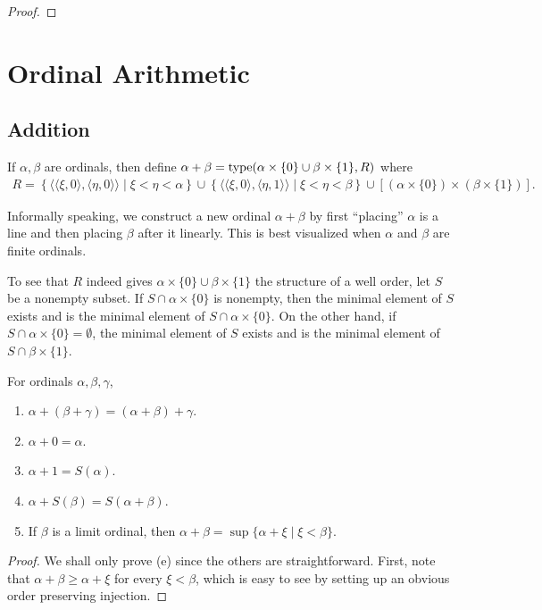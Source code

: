 \begin{proof}
    
\end{proof}

\section{Ordinal Arithmetic}
\subsection*{Addition}

\begin{definition}
    If $\alpha,\beta$ are ordinals, then define $\alpha + \beta = \operatorname{type}(\alpha\times\{0\}\cup\beta\times\{1\},R)$ where 
    \begin{align*}
        R = \left\{\langle\langle\xi,0\rangle,\langle\eta,0\rangle\rangle\mid \xi < \eta < \alpha\right\}\cup\left\{\langle\langle\xi,0\rangle,\langle\eta,1\rangle\rangle\mid\xi < \eta < \beta\right\}\cup\left[(\alpha\times\{0\})\times(\beta\times\{1\})\right].
    \end{align*}
\end{definition}

Informally speaking, we construct a new ordinal $\alpha + \beta$ by first ``placing'' $\alpha$ is a line and then placing $\beta$ after it linearly. This is best visualized when $\alpha$ and $\beta$ are finite ordinals.

To see that $R$ indeed gives $\alpha\times\{0\}\cup\beta\times\{1\}$ the structure of a well order, let $S$ be a nonempty subset. If $S\cap\alpha\times\{0\}$ is nonempty, then the minimal element of $S$ exists and is the minimal element of $S\cap\alpha\times\{0\}$. On the other hand, if $S\cap\alpha\times\{0\} = \emptyset$, the minimal element of $S$ exists and is the minimal element of $S\cap\beta\times\{1\}$. 

\begin{lemma}
    For ordinals $\alpha,\beta,\gamma$,
    \begin{enumerate}[label=(\alph*)]
        \item $\alpha + (\beta + \gamma) = (\alpha + \beta) + \gamma$.
        \item $\alpha + 0 = \alpha$.
        \item $\alpha + 1 = S(\alpha)$.
        \item $\alpha + S(\beta) = S(\alpha + \beta)$.
        \item If $\beta$ is a limit ordinal, then $\alpha + \beta = \sup\{\alpha + \xi\mid \xi < \beta\}$.
    \end{enumerate}
\end{lemma}
\begin{proof}
    We shall only prove (e) since the others are straightforward. First, note that $\alpha + \beta\ge\alpha + \xi$ for every $\xi < \beta$, which is easy to see by setting up an obvious order preserving injection. 
\end{proof}

